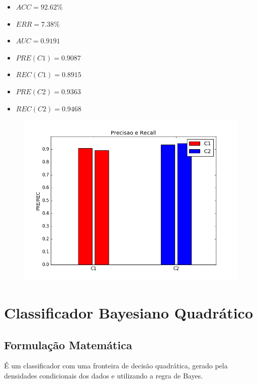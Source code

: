 \documentclass[11pt,a4paper]{article}
\numberwithin{equation}{section}
\begin{document}
\begin{minipage}{.5\textwidth}
\begin{itemize}
\item $ACC =  92.62 \%$
\item $ERR =  7.38 \%$
\item $AUC =  0.9191 $
\item $PRE(C1) =  0.9087 $
\item $REC(C1) =  0.8915 $
\item $PRE(C2) =  0.9363 $
\item $REC(C2) =  0.9468 $
\end{itemize}
\end{minipage}%
\begin{minipage}{.5\textwidth}
\begin{figure}[H]
\centering
  \includegraphics[width=\linewidth]{../img/naive_bayes_rec_std.png}
  \label{fig:percep}
\end{figure}
\end{minipage}%

\section{Classificador Bayesiano Quadrático}
\subsection{Formulação Matemática}
É um classificador com uma fronteira de decisão quadrática, gerado pela densidades condicionais dos dados e utilizando a regra de Bayes.
\end{document}
